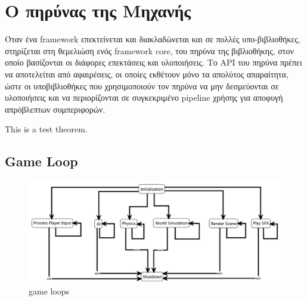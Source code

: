 	\chapter{Ο πηρύνας της Μηχανής}
	
	Όταν ένα framework επεκτείνεται και διακλαδώνεται και σε πολλές υπο-βιβλιοθήκες, στηρίζεται στη θεμελιώση ενός framework core, του πηρύνα της βιβλιοθήκης, στον οποίο βασίζονται οι διάφορες επεκτάσεις και υλοποιήσεις. Το \gls{API} του πηρύνα πρέπει να αποτελείται από αφαιρέσεις, οι οποίες εκθέτουν μόνο τα απολύτος απαραίτητα, ώστε οι υποβιβλιοθήκες που χρησιμοποιούν τον πηρύνα να μην δεσμεύονται σε υλοποιήσεις και να περιορίζονται σε συγκεκριμένο pipeline χρήσης για αποφυγή απρόβλεπτων συμπεριφορών. \cite{jaroslav08}
	
	\begin{theorem}
		This is a test theorem.
	\end{theorem}

	\section{Game Loop}
	\begin{figure}
		\centering
		\includegraphics[width=160mm]{Images/game_coding_complete_chapter7_gameloops}
		\caption{game loops}
		\label{fig:gameloops}
	\end{figure}
		
